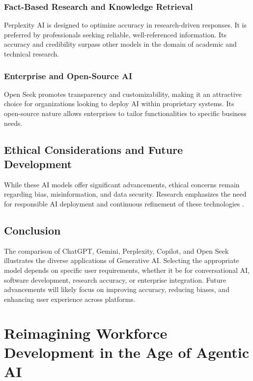 \documentclass[a4paper,headinclude=on,footinclude=on,12pt,oneside]{scrbook}
\begin{document}
\subsection{Fact-Based Research and Knowledge Retrieval}

Perplexity AI is designed to optimize accuracy in research-driven responses. It is preferred by professionals seeking reliable, well-referenced information. Its accuracy and credibility surpass other models in the domain of academic and technical research.

\subsection{Enterprise and Open-Source AI}

Open Seek promotes transparency and customizability, making it an attractive choice for organizations looking to deploy AI within proprietary systems. Its open-source nature allows enterprises to tailor functionalities to specific business needs.

\section{Ethical Considerations and Future Development}

While these AI models offer significant advancements, ethical concerns remain regarding bias, misinformation, and data security. Research emphasizes the need for responsible AI deployment and continuous refinement of these technologies \cite{GenerativeArtificialIntelligence}.

\section{Conclusion}

The comparison of ChatGPT, Gemini, Perplexity, Copilot, and Open Seek illustrates the diverse applications of Generative AI. Selecting the appropriate model depends on specific user requirements, whether it be for conversational AI, software development, research accuracy, or enterprise integration. Future advancements will likely focus on improving accuracy, reducing biases, and enhancing user experience across platforms.



\chapter{Reimagining Workforce Development in the Age of Agentic AI}
\end{document}
